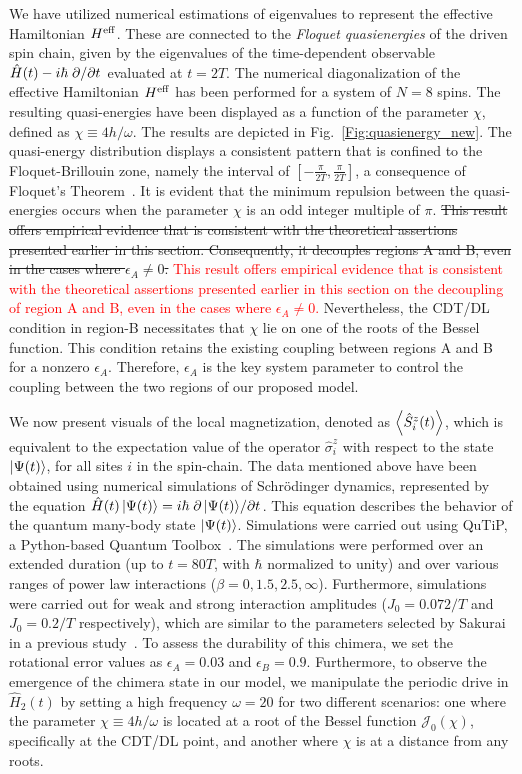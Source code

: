 \documentclass[12pt]{iopart}
\newcommand{\red}[1]{\textcolor{red}{#1}}
\begin{document}
We have utilized numerical estimations of eigenvalues to represent the effective Hamiltonian $H^{\rm eff}$. These are connected to the \textit{ Floquet quasienergies} of the driven spin chain, given by the eigenvalues of the time-dependent observable $\hat{H}(t)-i\hbar\pdv*{}{t}$ evaluated at $t=2T$. The numerical diagonalization of the effective Hamiltonian $H^{\rm eff}$ has been performed for a system of $N=8$ spins. The resulting quasi-energies have been displayed as a function of the parameter $\chi$, defined as $\chi\equiv 4h/\omega$. The results are depicted in Fig.~\ref{Fig:quasienergy_new}. The quasi-energy distribution displays a consistent pattern that is confined to the Floquet-Brillouin zone, namely the interval of $[-\frac{\pi}{2T}, \frac{\pi}{2T}]$, a consequence of Floquet's Theorem~\cite{dutta2014}. It is evident that the minimum repulsion between the quasi-energies occurs when the parameter $\chi$ is an odd integer multiple of $\pi$. \sout{This result offers empirical evidence that is consistent with the theoretical assertions presented earlier in this section. Consequently, it decouples regions A and B, even in the cases where $\epsilon_A \neq 0$.} \red{This result offers empirical evidence that is consistent with the theoretical assertions presented earlier in this section on the decoupling of region A and B, even in the cases where $\epsilon_A \neq 0$.} Nevertheless, the CDT/DL condition in region-B necessitates that $\chi$ lie on one of the roots of the Bessel function. This condition retains the existing coupling between regions A and B for a nonzero $\epsilon_A$. Therefore, $\epsilon_A$ is the key system parameter to control the coupling between the two regions of our proposed model. 	
	
We now present visuals of the local magnetization, denoted as $\expval{\hat{S}^z_i (t)}$, which is equivalent to the expectation value of the operator $\hat{\sigma}^z_i$ with respect to the state $\ket{\Psi(t)}$, for all sites $i$ in the spin-chain. The data mentioned above have been obtained using numerical simulations of Schr\"odinger dynamics, represented by the equation $\hat{H}(t)\ket{\Psi(t)}= i \hbar \pdv*{\ket{\Psi(t)}}{t}$. This equation describes the behavior of the quantum many-body state $\ket{\Psi(t)}$. Simulations were carried out using QuTiP, a Python-based Quantum Toolbox~\cite{Johansson2013}. The simulations were performed over an extended duration (up to $t = 80T$, with $\hbar$ normalized to unity) and over various ranges of power law interactions ($\beta = 0,1.5,2.5,\infty$). Furthermore, simulations were carried out for weak and strong interaction amplitudes ($J_0 = 0.072/T$ and $J_0 = 0.2/T$ respectively), which are similar to the parameters selected by Sakurai in a previous study~\cite{sakurai_phys_nodate}. To assess the durability of this chimera, we set the rotational error values as $\epsilon_A = 0.03$ and $\epsilon_B = 0.9$. Furthermore, to observe the emergence of the chimera state in our model, we manipulate the periodic drive in $\hat{H}_2(t)$ by setting a high frequency $\omega=20$ for two different scenarios: one where the parameter $\chi\equiv4h/\omega$ is located at a root of the Bessel function $\mathcal{J}_0(\chi)$, specifically at the CDT/DL point, and another where $\chi$ is at a distance from any roots.
	
\end{document}
